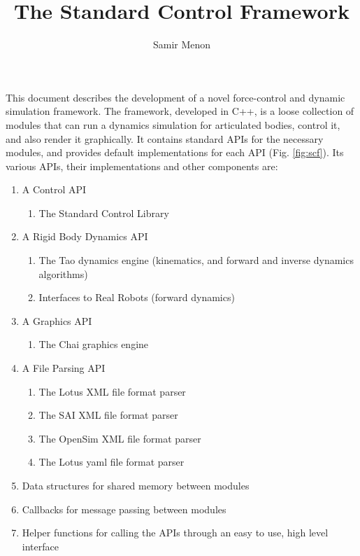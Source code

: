 \documentclass[12pt]{article}
\title{The Standard Control Framework}
\author{Samir Menon}
\begin{document}
\maketitle

This document describes the development of a novel force-control and dynamic simulation 
framework. The framework, developed in C++, is a loose collection of modules
that can run a dynamics simulation for articulated bodies, control it, and also
render it graphically. 
It contains standard APIs for the necessary modules, and provides default 
implementations for each API (Fig. \ref{fig:scf}). 
Its various APIs, their implementations and other components are:

\begin{enumerate}
 \item A Control API
    \begin{enumerate}
      \item The Standard Control Library
    \end{enumerate}
 \item A Rigid Body Dynamics API
    \begin{enumerate}
      \item The Tao dynamics engine (kinematics, and forward and inverse dynamics algorithms)
      \item Interfaces to Real Robots (forward dynamics)
    \end{enumerate}
 \item A Graphics API
    \begin{enumerate}
      \item The Chai graphics engine
    \end{enumerate}
 \item A File Parsing API
    \begin{enumerate}
      \item The Lotus XML file format parser
      \item The SAI XML file format parser
      \item The OpenSim XML file format parser
      \item The Lotus yaml file format parser
    \end{enumerate}
  \item Data structures for shared memory between modules
  \item Callbacks for message passing between modules
  \item Helper functions for calling the APIs through an easy to use, 
high level interface
\end{enumerate}
\end{document}
